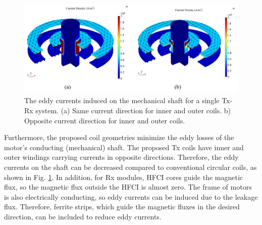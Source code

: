 \documentclass[journal]{IEEEtran}
\begin{document}
\begin{figure}[h!]
    \centering
    \includegraphics[width=1\linewidth]{opposite_direction.png}
    \caption{The eddy currents induced on the mechanical shaft for a single Tx-Rx system. (a) Same current direction for inner and outer coils. b) Opposite current direction for inner and outer coils. }
    \label{fig:opposite}
\end{figure}

Furthermore, the proposed coil geometries minimize the eddy losses of the motor's conducting (mechanical) shaft. The proposed Tx coils have inner and outer windings carrying currents in opposite directions. 
Therefore, the eddy currents on the shaft can be decreased compared to conventional circular coils, as shown in Fig. \ref{fig:opposite}. 
In addition, for Rx modules, HFCI cores guide the magnetic flux, so the magnetic flux outside the HFCI is almost zero. The frame of motors is also electrically conducting, so  eddy currents can be induced due to the leakage flux.
Therefore, ferrite strips, which guide the magnetic fluxes in the desired direction, can be included to reduce eddy currents.
\end{document}
